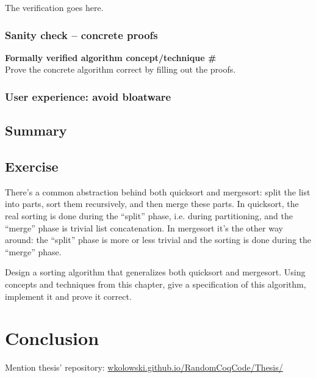 \documentclass[declaration,mgr,english,shortabstract]{iithesis}
\newcounter{cnt}
\newcommand{\runcnt}{\#\arabic{cnt}}
\newcommand{\concept}[1]
{
    \refstepcounter{cnt}
    \begin{center}
        \textbf{Formally verified algorithm concept/technique \runcnt} \\
        #1
    \end{center}
}
\begin{document}
The verification goes here.

\subsection{Sanity check -- concrete proofs}

\concept{Prove the concrete algorithm correct by filling out the proofs.}

\subsection{User experience: avoid bloatware}

\section{Summary} \label{summary2}

\section{Exercise}

There's a common abstraction behind both quicksort and mergesort: split the list into parts, sort them recursively, and then merge these parts. In quicksort, the real sorting is done during the ``split'' phase, i.e. during partitioning, and the ``merge'' phase is trivial list concatenation. In mergesort it's the other way around: the ``split'' phase is more or less trivial and the sorting is done during the ``merge'' phase.

Design a sorting algorithm that generalizes both quicksort and mergesort. Using concepts and techniques from this chapter, give a specification of this algorithm, implement it and prove it correct.

\chapter{Conclusion}

Mention thesis' repository: \url{wkolowski.github.io/RandomCoqCode/Thesis/}

\end{document}
